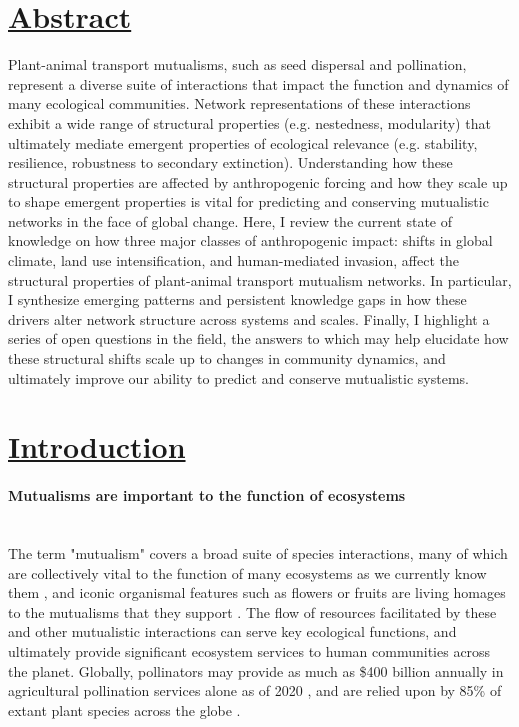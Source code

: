 \section*{\textbf{\underline{Abstract}}}
Plant-animal transport mutualisms, such as seed dispersal and pollination, represent a diverse suite of interactions that impact the function and dynamics of many ecological communities. Network representations of these interactions exhibit a wide range of structural properties (e.g. nestedness, modularity) that ultimately mediate emergent properties of ecological relevance (e.g. stability, resilience, robustness to secondary extinction). Understanding how these structural properties are affected by anthropogenic forcing and how they scale up to shape emergent properties is vital for predicting and conserving mutualistic networks in the face of global change. Here, I review the current state of knowledge on how three major classes of anthropogenic impact: shifts in global climate, land use intensification, and human-mediated invasion, affect the structural properties of plant-animal transport mutualism networks. In particular, I synthesize emerging patterns and persistent knowledge gaps in how these drivers alter network structure across systems and scales. Finally, I highlight a series of open questions in the field, the answers to which may help elucidate how these structural shifts scale up to changes in community dynamics, and ultimately improve our ability to predict and conserve mutualistic systems.

\section*{\textbf{\underline{Introduction}}}
\paragraph*{Mutualisms are important to the function of ecosystems}\mbox{}\\ 
The term "mutualism" covers a broad suite of species interactions, many of which are collectively vital to the function of many ecosystems as we currently know them \parencite{boucher1982ecology}, and iconic organismal features such as flowers or fruits are living homages to the mutualisms that they support \parencite{weiblen2015evolutionary}. The flow of resources facilitated by these and other mutualistic interactions can serve key ecological functions, and ultimately provide significant ecosystem services to human communities across the planet. Globally, pollinators may provide as much as \$400 billion annually in agricultural pollination services alone as of 2020 \parencite{porto2020pollination}, and are relied upon by 85\% of extant plant species across the globe \parencite{ollerton2011many}.
    

